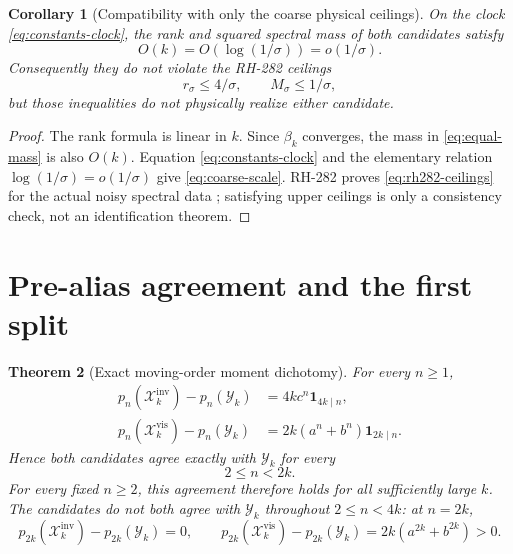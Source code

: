 \documentclass[11pt]{article}
\newtheorem{theorem}{Theorem}[section]
\newtheorem{corollary}[theorem]{Corollary}
\theoremstyle{remark}
\newcommand{\cY}{\mathcal Y}
\newcommand{\cX}{\mathcal X}
\newcommand{\one}{\mathbf 1}
\newcommand{\inv}{\mathrm{inv}}
\newcommand{\vis}{\mathrm{vis}}
\begin{document}
\begin{corollary}[Compatibility with only the coarse physical ceilings]
\label{cor:coarse-compatible}
On the clock \eqref{eq:constants-clock}, the rank and squared spectral mass
of both candidates satisfy
\begin{equation}\label{eq:coarse-scale}
 O(k)=O(\log(1/\sigma))=o(1/\sigma).
\end{equation}
Consequently they do not violate the RH-282 ceilings
\begin{equation}\label{eq:rh282-ceilings}
 r_\sigma\le4/\sigma,
 \qquad M_\sigma\le1/\sigma,
\end{equation}
but those inequalities do not physically realize either candidate.
\end{corollary}

\begin{proof}
The rank formula is linear in $k$.  Since $\beta_k$ converges, the mass in
\eqref{eq:equal-mass} is also $O(k)$.  Equation
\eqref{eq:constants-clock} and the elementary relation
$\log(1/\sigma)=o(1/\sigma)$ give \eqref{eq:coarse-scale}.  RH-282 proves
\eqref{eq:rh282-ceilings} for the actual noisy spectral data
\citep{WangSpectralTail2026}; satisfying upper ceilings is only a consistency
check, not an identification theorem.
\end{proof}

\section{Pre-alias agreement and the first split}

\begin{theorem}[Exact moving-order moment dichotomy]
\label{thm:moment-dichotomy}
For every $n\ge1$,
\begin{align}
 p_n(\cX_k^{\inv})-p_n(\cY_k)
 &=4kc^n\one_{4k\mid n},
 \label{eq:inv-difference}\\
 p_n(\cX_k^{\vis})-p_n(\cY_k)
 &=2k(a^n+b^n)\one_{2k\mid n}.
 \label{eq:vis-difference}
\end{align}
Hence both candidates agree exactly with $\cY_k$ for every
\begin{equation}\label{eq:pre-alias}
 2\le n<2k.
\end{equation}
For every fixed $n\ge2$, this agreement therefore holds for all sufficiently
large $k$.  The candidates do \emph{not} both agree with $\cY_k$ throughout
$2\le n<4k$: at $n=2k$,
\begin{equation}\label{eq:first-split}
 p_{2k}(\cX_k^{\inv})-p_{2k}(\cY_k)=0,
 \qquad
 p_{2k}(\cX_k^{\vis})-p_{2k}(\cY_k)
 =2k(a^{2k}+b^{2k})>0.
\end{equation}
\end{theorem}
\end{document}
